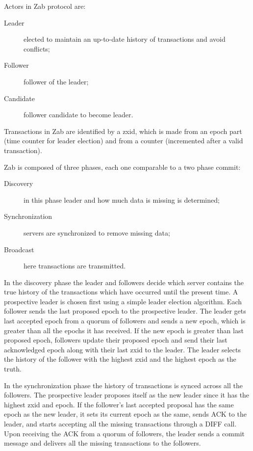 Actors in Zab protocol are:
\begin{description}
    \item[Leader] elected to maintain an up-to-date history of transactions and avoid conflicts;
    \item[Follower] follower of the leader;
    \item[Candidate] follower candidate to become leader. 
\end{description}

Transactions in Zab are identified by a zxid, which is made from an epoch part (time counter for leader election) and from a counter (incremented after a valid transaction).

Zab is composed of three phases, each one comparable to a two phase commit:
\begin{description}
    \item[Discovery] in this phase leader and how much data is missing is determined;
    \item[Synchronization] servers are synchronized to remove missing data;
    \item[Broadcast] here transactions are transmitted.   
\end{description}

In the discovery phase the leader and followers decide which server contains the true history of the transactions which have occurred until the present time.
A prospective leader is chosen first using a simple leader election algorithm. Each follower sends the last proposed epoch to the prospective leader.
The leader gets last accepted epoch from a quorum of followers and sends a new epoch, which is greater than all the epochs it has received.
If the new epoch is greater than last proposed epoch, followers update their proposed epoch and send their last acknowledged epoch along with their last zxid to the leader.
The leader selects the history of the follower with the highest zxid and the highest epoch as the truth.

In the synchronization phase the history of transactions is synced across all the followers.
The prospective leader proposes itself as the new leader since it has the highest zxid and epoch.
If the follower's last accepted proposal has the same epoch as the new leader, it sets its current epoch as the same, sends ACK to the leader, and starts accepting all the missing transactions through a DIFF call.
Upon receiving the ACK from a quorum of followers, the leader sends a commit message and delivers all the missing transactions to the followers.

